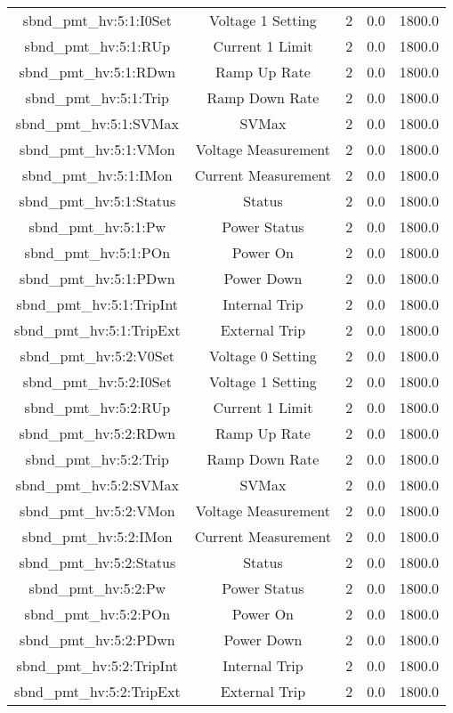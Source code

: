 \begin{table}[ptb]
\begin{tabular}{c | c c c c}
sbnd_pmt_hv:5:1:I0Set & Voltage 1 Setting & 2 & 0.0 & 1800.0\\ 
sbnd_pmt_hv:5:1:RUp & Current 1 Limit & 2 & 0.0 & 1800.0\\ 
sbnd_pmt_hv:5:1:RDwn & Ramp Up Rate & 2 & 0.0 & 1800.0\\ 
sbnd_pmt_hv:5:1:Trip & Ramp Down Rate & 2 & 0.0 & 1800.0\\ 
sbnd_pmt_hv:5:1:SVMax & SVMax & 2 & 0.0 & 1800.0\\ 
sbnd_pmt_hv:5:1:VMon & Voltage Measurement & 2 & 0.0 & 1800.0\\ 
sbnd_pmt_hv:5:1:IMon & Current Measurement & 2 & 0.0 & 1800.0\\ 
sbnd_pmt_hv:5:1:Status & Status & 2 & 0.0 & 1800.0\\ 
sbnd_pmt_hv:5:1:Pw & Power Status & 2 & 0.0 & 1800.0\\ 
sbnd_pmt_hv:5:1:POn & Power On & 2 & 0.0 & 1800.0\\ 
sbnd_pmt_hv:5:1:PDwn & Power Down & 2 & 0.0 & 1800.0\\ 
sbnd_pmt_hv:5:1:TripInt & Internal Trip & 2 & 0.0 & 1800.0\\ 
sbnd_pmt_hv:5:1:TripExt & External Trip & 2 & 0.0 & 1800.0\\ 
sbnd_pmt_hv:5:2:V0Set & Voltage 0 Setting & 2 & 0.0 & 1800.0\\ 
sbnd_pmt_hv:5:2:I0Set & Voltage 1 Setting & 2 & 0.0 & 1800.0\\ 
sbnd_pmt_hv:5:2:RUp & Current 1 Limit & 2 & 0.0 & 1800.0\\ 
sbnd_pmt_hv:5:2:RDwn & Ramp Up Rate & 2 & 0.0 & 1800.0\\ 
sbnd_pmt_hv:5:2:Trip & Ramp Down Rate & 2 & 0.0 & 1800.0\\ 
sbnd_pmt_hv:5:2:SVMax & SVMax & 2 & 0.0 & 1800.0\\ 
sbnd_pmt_hv:5:2:VMon & Voltage Measurement & 2 & 0.0 & 1800.0\\ 
sbnd_pmt_hv:5:2:IMon & Current Measurement & 2 & 0.0 & 1800.0\\ 
sbnd_pmt_hv:5:2:Status & Status & 2 & 0.0 & 1800.0\\ 
sbnd_pmt_hv:5:2:Pw & Power Status & 2 & 0.0 & 1800.0\\ 
sbnd_pmt_hv:5:2:POn & Power On & 2 & 0.0 & 1800.0\\ 
sbnd_pmt_hv:5:2:PDwn & Power Down & 2 & 0.0 & 1800.0\\ 
sbnd_pmt_hv:5:2:TripInt & Internal Trip & 2 & 0.0 & 1800.0\\ 
sbnd_pmt_hv:5:2:TripExt & External Trip & 2 & 0.0 & 1800.0\\ 

\end{tabular}
\end{table}
